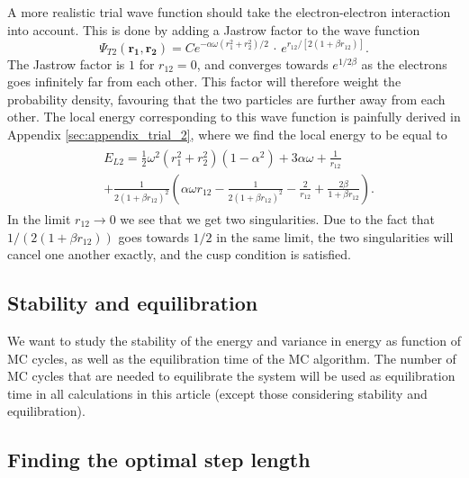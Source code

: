 \documentclass[%
 reprint,
nofootinbib,
aps,
]{revtex4-1}
\begin{document}
A more realistic trial wave function should take the electron-electron interaction into account. This is done by adding a Jastrow factor to the wave function
\begin{equation}
  \Psi_{T2}(\mathbf{r_1}, \mathbf{r_2}) = C e^{-\alpha\omega(r_1^2 + r_2^2)/2}\,\cdot\, e^{r_{12}/[2\left( 1 + \beta r_{12} \right)]}. \label{trial_2}
\end{equation}
The Jastrow factor is $1$ for $r_{12} = 0$, and converges towards $e^{1/2\beta}$ as the electrons goes infinitely far from each other. This factor will therefore weight the probability density, favouring that the two particles are further away from each other.
The local energy corresponding to this wave function is painfully derived in Appendix \vref{sec:appendix_trial_2}, where we find the local energy to be equal to
\begingroup\makeatletter\def\f@size{7}\check@mathfonts
\begin{align}
\begin{split}
 &E_{L2} = \frac{1}{2}\omega^2\left(r_1^2 + r_2^2 \right)\left( 1 - \alpha^2  \right) + 3\alpha \omega + \frac{1}{r_{12}}\\
&+ \frac{1}{2\left(1+\beta r_{12}\right)^2}\left(\alpha\omega r_{12} - \frac{1}{2\left(1+\beta r_{12}\right)^2} - \frac{2}{r_{12}}  + \frac{2\beta}{1+\beta r_{12}}\right). \label{energy_2}
\end{split}
\end{align}
\endgroup
In the limit $r_{12}\rightarrow 0$ we see that we get two singularities. Due to the fact that $1/(2(1+\beta r_{12}))$ goes towards $1/2$ in the same limit, the two singularities will cancel one another exactly, and the cusp condition \cite{kvaal} is satisfied.

\subsection{Stability and equilibration}

We want to study the stability of the energy and variance in energy as function of MC cycles, as well as the equilibration time of the MC algorithm. The number of MC cycles that are needed to equilibrate the system will be used as equilibration time in all calculations in this article (except those considering stability and equilibration).

\subsection{Finding the optimal step length}
\end{document}
